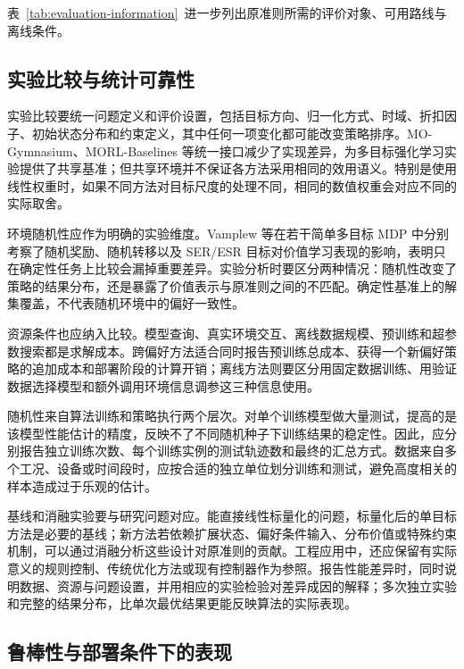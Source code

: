 表~\ref{tab:evaluation-information}~进一步列出原准则所需的评价对象、可用路线与离线条件。


\subsection{实验比较与统计可靠性}\label{sec:eval-stats}

实验比较要统一问题定义和评价设置，包括目标方向、归一化方式、时域、折扣因子、初始状态分布和约束定义，其中任何一项变化都可能改变策略排序。MO-Gymnasium、MORL-Baselines 等统一接口减少了实现差异，为多目标强化学习实验提供了共享基准\cite{felten2023}；但共享环境并不保证各方法采用相同的效用语义。特别是使用线性权重时，如果不同方法对目标尺度的处理不同，相同的数值权重会对应不同的实际取舍。

环境随机性应作为明确的实验维度。Vamplew 等在若干简单多目标 MDP 中分别考察了随机奖励、随机转移以及 SER/ESR 目标对价值学习表现的影响，表明只在确定性任务上比较会漏掉重要差异\cite{vamplew2022stochasticity}。实验分析时要区分两种情况：随机性改变了策略的结果分布，还是暴露了价值表示与原准则之间的不匹配。确定性基准上的解集覆盖，不代表随机环境中的偏好一致性。

资源条件也应纳入比较。模型查询、真实环境交互、离线数据规模、预训练和超参数搜索都是求解成本。跨偏好方法适合同时报告预训练总成本、获得一个新偏好策略的追加成本和部署阶段的计算开销；离线方法则要区分用固定数据训练、用验证数据选择模型和额外调用环境信息调参这三种信息使用。

随机性来自算法训练和策略执行两个层次。对单个训练模型做大量测试，提高的是该模型性能估计的精度，反映不了不同随机种子下训练结果的稳定性\cite{vamplew2011,agarwal2021}。因此，应分别报告独立训练次数、每个训练实例的测试轨迹数和最终的汇总方式。数据来自多个工况、设备或时间段时，应按合适的独立单位划分训练和测试，避免高度相关的样本造成过于乐观的估计。

基线和消融实验要与研究问题对应。能直接线性标量化的问题，标量化后的单目标方法是必要的基线；新方法若依赖扩展状态、偏好条件输入、分布价值或特殊约束机制，可以通过消融分析这些设计对原准则的贡献。工程应用中，还应保留有实际意义的规则控制、传统优化方法或现有控制器作为参照。报告性能差异时，同时说明数据、资源与问题设置，并用相应的实验检验对差异成因的解释；多次独立实验和完整的结果分布，比单次最优结果更能反映算法的实际表现\cite{agarwal2021}。

\subsection{鲁棒性与部署条件下的表现}\label{sec:eval-robust}

